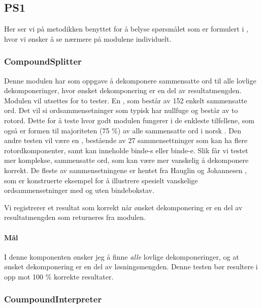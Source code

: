 \subsection{PS1}

Her ser vi på metodikken benyttet for å belyse spørsmålet som er formulert i , hvor vi ønsker å se nærmere på modulene individuelt.

\subsubsection{CompoundSplitter}

Denne modulen har som oppgave å dekomponere sammensatte ord til alle lovlige dekomponeringer, hvor ønsket dekomponering er en del av resultatmengden. Modulen vil utsettes for to tester. En , som består av 152 enkelt sammensatte ord. Det vil si ordsammensetninger som typisk har nullfuge og består av to rotord. Dette for å teste hvor godt modulen fungerer i de enkleste tilfellene, som også er formen til majoriteten (75 \%) av alle sammensatte ord i norsk \cite{johannessen1996automatic}. Den andre testen vil være en , bestående av 27 sammensettninger som kan ha flere rotordkomponenter, samt kan inneholde binde-s eller binde-e. Slik får vi testet mer komplekse, sammensatte ord, som kan være mer vanskelig å dekomponere korrekt. De fleste av sammensetningene er hentet fra Hauglin og Johannesen \cite{johannessen1996automatic}, som er konstruerte eksempel for å illustrere spesielt vanskelige ordsammensetninger med og uten bindebokstav.

Vi registrerer et resultat som korrekt når ønsket dekomponering er en del av resultatmengden som returneres fra modulen.

\newline
{}

\paragraph{Mål} I denne komponenten ønsker jeg å finne \textit{alle} lovlige dekomponeringer, og at ønsket dekomponering er en del av løsningsmengden. Denne testen bør resultere i opp mot 100 \% korrekte resultater. 
	
\subsubsection{CoumpoundInterpreter}

